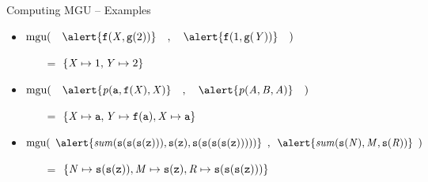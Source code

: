 \documentclass[presentation]{beamer}\mode<presentation>{\usetheme{AMSBolognaFC}}
\begin{document}
\begin{frame}{Computing MGU -- Examples}
    \begin{itemize}
        \item $\text{mgu}(\quad 
            \alert{\functor{f}(\variable{X}, \functor{g}(2))} 
            \quad , \quad 
            \alert{\functor{f}(1, \functor{g}(\variable{Y}))}  
        \quad)$ 
        \begin{itemize}
            \item[$=$] $\{ \mathit{X} \mapsto 1, \mathit{Y} \mapsto 2 \}$
        \end{itemize}

        \vfill

        \item $\text{mgu}(\quad 
            \alert{\predication{p}(\functor{a}, \functor{f}(\variable{X}), \variable{X})} 
            \quad , \quad 
            \alert{\predication{p}(\variable{A}, \variable{B}, \variable{A})} 
        \quad)$ 
        \begin{itemize}
            \item[$=$] $\{ \mathit{X} \mapsto \mathtt{a}, \mathit{Y} \mapsto \mathtt{f}(\mathtt{a}), \mathit{X} \mapsto \mathtt{a} \}$
        \end{itemize}

        \vfill

        \item $\text{mgu}(\enspace 
            \alert{\predication{sum}(\functor{s}(\functor{s}(\functor{s}(\functor{z}))), \functor{s}(\functor{z}), \functor{s}(\functor{s}(\functor{s}(\functor{s}(\functor{z})))))} 
            \enspace , \enspace 
            \alert{\predication{sum}(\functor{s}(\variable{N}), \variable{M}, \functor{s}(\variable{R}))} 
        \enspace)$ 
        \begin{itemize}
            \item[$=$] $\{ \mathit{N} \mapsto \mathtt{s}(\mathtt{s}(\mathtt{z})), \mathit{M} \mapsto \mathtt{s}(\mathtt{z}), \mathit{R} \mapsto \mathtt{s}(\mathtt{s}(\mathtt{s}(\mathtt{z}))) \}$
        \end{itemize}
    
    \end{itemize}
\end{frame}
\end{document}
